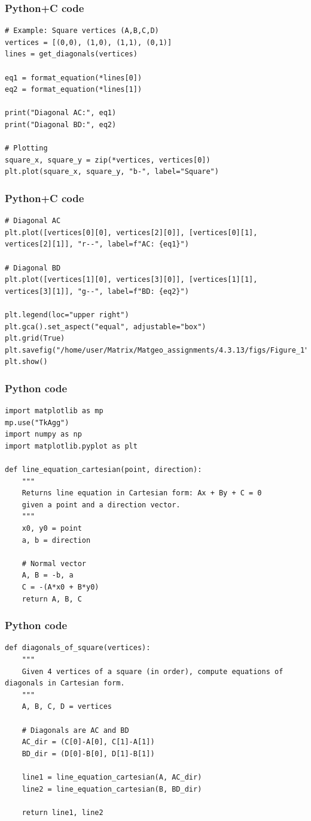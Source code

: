 \documentclass{beamer}
\begin{document}
\begin{frame}[fragile]
    \frametitle{Python+C code}

    \begin{lstlisting}
# Example: Square vertices (A,B,C,D)
vertices = [(0,0), (1,0), (1,1), (0,1)]
lines = get_diagonals(vertices)

eq1 = format_equation(*lines[0])
eq2 = format_equation(*lines[1])

print("Diagonal AC:", eq1)
print("Diagonal BD:", eq2)

# Plotting
square_x, square_y = zip(*vertices, vertices[0])
plt.plot(square_x, square_y, "b-", label="Square")
    \end{lstlisting}
\end{frame}

\begin{frame}[fragile]
    \frametitle{Python+C code}

    \begin{lstlisting}
# Diagonal AC
plt.plot([vertices[0][0], vertices[2][0]], [vertices[0][1], vertices[2][1]], "r--", label=f"AC: {eq1}")

# Diagonal BD
plt.plot([vertices[1][0], vertices[3][0]], [vertices[1][1], vertices[3][1]], "g--", label=f"BD: {eq2}")

plt.legend(loc="upper right")
plt.gca().set_aspect("equal", adjustable="box")
plt.grid(True)
plt.savefig("/home/user/Matrix/Matgeo_assignments/4.3.13/figs/Figure_1")
plt.show()
    \end{lstlisting}
\end{frame}

\begin{frame}[fragile]
    \frametitle{Python code}

    \begin{lstlisting}
import matplotlib as mp
mp.use("TkAgg")
import numpy as np
import matplotlib.pyplot as plt

def line_equation_cartesian(point, direction):
    """
    Returns line equation in Cartesian form: Ax + By + C = 0
    given a point and a direction vector.
    """
    x0, y0 = point
    a, b = direction
    
    # Normal vector
    A, B = -b, a
    C = -(A*x0 + B*y0)
    return A, B, C
    \end{lstlisting}
\end{frame}

\begin{frame}[fragile]
    \frametitle{Python code}

    \begin{lstlisting}
def diagonals_of_square(vertices):
    """
    Given 4 vertices of a square (in order), compute equations of diagonals in Cartesian form.
    """
    A, B, C, D = vertices
    
    # Diagonals are AC and BD
    AC_dir = (C[0]-A[0], C[1]-A[1])
    BD_dir = (D[0]-B[0], D[1]-B[1])
    
    line1 = line_equation_cartesian(A, AC_dir)
    line2 = line_equation_cartesian(B, BD_dir)
    
    return line1, line2
    \end{lstlisting}
\end{frame}
\end{document}

